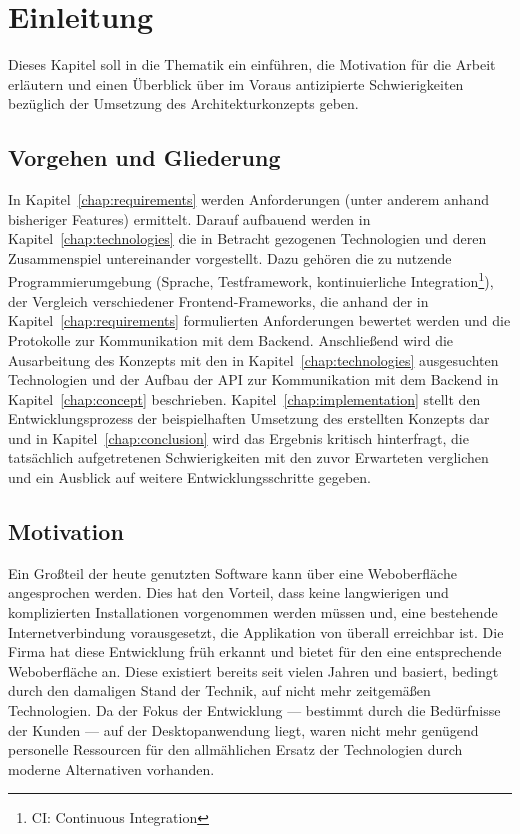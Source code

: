 \chapter{Einleitung}\label{chap:introduction}
Dieses Kapitel soll in die Thematik ein einführen, die Motivation für die Arbeit erläutern und einen Überblick über im Voraus antizipierte Schwierigkeiten bezüglich der Umsetzung des Architekturkonzepts geben.

\section{Vorgehen und Gliederung}
In Kapitel~\ref{chap:requirements} werden Anforderungen (unter anderem anhand bisheriger Features) ermittelt.
Darauf aufbauend werden in Kapitel~\ref{chap:technologies} die in Betracht gezogenen Technologien und deren Zusammenspiel untereinander vorgestellt. Dazu gehören die zu nutzende Programmierumgebung (Sprache, Testframework, kontinuierliche Integration\footnote{CI\@: Continuous Integration}), der Vergleich verschiedener Frontend-Frameworks, die anhand der in Kapitel~\ref{chap:requirements} formulierten Anforderungen bewertet werden und die Protokolle zur Kommunikation mit dem Backend.
Anschließend wird die Ausarbeitung des Konzepts mit den in Kapitel~\ref{chap:technologies} ausgesuchten Technologien und der Aufbau der API zur Kommunikation mit dem Backend in Kapitel~\ref{chap:concept} beschrieben.
Kapitel~\ref{chap:implementation} stellt den Entwicklungsprozess der beispielhaften Umsetzung des erstellten Konzepts dar und in Kapitel~\ref{chap:conclusion} wird das Ergebnis kritisch hinterfragt, die tatsächlich aufgetretenen Schwierigkeiten mit den zuvor Erwarteten verglichen und ein Ausblick auf weitere Entwicklungsschritte gegeben.

\section{Motivation}
Ein Großteil der heute genutzten Software kann über eine Weboberfläche angesprochen werden. Dies hat den Vorteil, dass keine langwierigen und komplizierten Installationen vorgenommen werden müssen und, eine bestehende Internetverbindung vorausgesetzt, die Applikation von überall erreichbar ist. Die Firma  hat diese Entwicklung früh erkannt und bietet für den  eine entsprechende Weboberfläche an. Diese existiert bereits seit vielen Jahren und basiert, bedingt durch den damaligen Stand der Technik, auf nicht mehr zeitgemäßen Technologien. Da der Fokus der Entwicklung --- bestimmt durch die Bedürfnisse der Kunden --- auf der Desktopanwendung liegt, waren nicht mehr genügend personelle Ressourcen für den allmählichen Ersatz der Technologien durch moderne Alternativen vorhanden.

